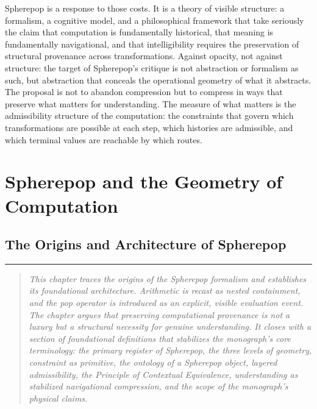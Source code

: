 \documentclass[12pt,openany]{book}
\theoremstyle{plain}
\theoremstyle{definition}
\theoremstyle{remark}
\newcommand{\chapterrule}{%
  \vspace{4pt}%
  {\color{SpherepopBlue}\rule{\textwidth}{0.8pt}}%
  \vspace{10pt}%
}
\newenvironment{chapterprecis}{%
  \begin{quote}\small\itshape}{%
  \end{quote}\medskip}
\begin{document}
Spherepop is a response to those costs. It is a theory of visible structure: a formalism, a cognitive model, and a philosophical framework that take seriously the claim that computation is fundamentally historical, that meaning is fundamentally navigational, and that intelligibility requires the preservation of structural provenance across transformations. Against opacity, not against structure: the target of Spherepop's critique is not abstraction or formalism as such, but abstraction that conceals the operational geometry of what it abstracts. The proposal is not to abandon compression but to compress in ways that preserve what matters for understanding. The measure of what matters is the admissibility structure of the computation: the constraints that govern which transformations are possible at each step, which histories are admissible, and which terminal values are reachable by which routes.

 \clearpage

\part{Spherepop and the Geometry of Computation}

\chapter{The Origins and Architecture of Spherepop}
\chapterrule

\begin{chapterprecis}
This chapter traces the origins of the Spherepop formalism and
establishes its foundational architecture. Arithmetic is recast
as nested containment, and the \emph{pop} operator is introduced
as an explicit, visible evaluation event. The chapter argues that
preserving computational provenance is not a luxury but a
structural necessity for genuine understanding. It closes with a
section of foundational definitions that stabilizes the
monograph's core terminology: the primary register of Spherepop,
the three levels of geometry, constraint as primitive, the
ontology of a Spherepop object, layered admissibility, the
Principle of Contextual Equivalence, understanding as stabilized
navigational compression, and the scope of the monograph's
physical claims.
\end{chapterprecis}
\end{document}
